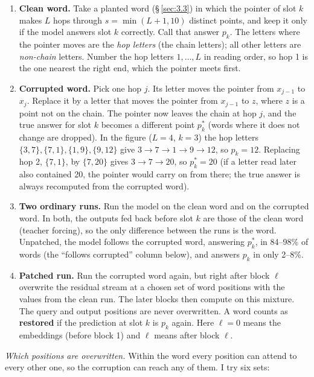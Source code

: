 \documentclass[paper=a4,fontsize=11pt,DIV=11,parskip=half,headings=small,numbers=noendperiod]{scrartcl}
\DeclareRobustCommand{\lead}[1]{\textsf{\bfseries\color{accent}#1}}
\begin{document}
\begin{enumerate}
\item \lead{Clean word.} Take a planted word (\S\,\ref{sec:3.3}) in which the pointer of slot $k$ makes $L$ hops
  through $s=\min(L+1,10)$ distinct points, and keep it only if the model answers slot $k$ correctly. Call that
  answer $p_k$. The letters where the pointer moves are the \emph{hop letters} (the chain letters); all other
  letters are \emph{non-chain} letters. Number the hop letters $1,\dots,L$ in reading order, so hop 1 is the one
  nearest the right end, which the pointer meets first.
\item \lead{Corrupted word.} Pick one hop $j$. Its letter moves the pointer from $x_{j-1}$ to $x_j$. Replace it
  by a letter that moves the pointer from $x_{j-1}$ to $z$, where $z$ is a point not on the chain. The pointer
  now leaves the chain at hop $j$, and the true answer for slot $k$ becomes a different point $p^*_k$ (words
  where it does not change are dropped). In the figure ($L=4$, $k=3$) the hop letters
  $\{3,7\},\{7,1\},\{1,9\},\{9,12\}$ give $3\to7\to1\to9\to12$, so $p_k=12$. Replacing hop 2, $\{7,1\}$, by
  $\{7,20\}$ gives $3\to7\to20$, so $p^*_k=20$ (if a letter read later also contained 20, the pointer would
  carry on from there; the true answer is always recomputed from the corrupted word).
\item \lead{Two ordinary runs.} Run the model on the clean word and on the corrupted word. In both, the outputs
  fed back before slot $k$ are those of the clean word (teacher forcing), so the only difference between the
  runs is the word. Unpatched, the model follows the corrupted word, answering $p^*_k$, in 84–98\% of words (the
  “follows corrupted” column below), and answers $p_k$ in only 2–8\%.
\item \lead{Patched run.} Run the corrupted word again, but right after block $\ell$ overwrite the residual
  stream at a chosen set of word positions with the values from the clean run. The later blocks then compute on
  this mixture. The query and output positions are never overwritten. A word counts as \textbf{restored} if the
  prediction at slot $k$ is $p_k$ again. Here $\ell=0$ means the embeddings (before block 1) and $\ell$ means
  after block $\ell$.
\end{enumerate}

\emph{Which positions are overwritten.} Within the word every position can attend to every other one, so the
corruption can reach any of them. I try six sets:
\end{document}
